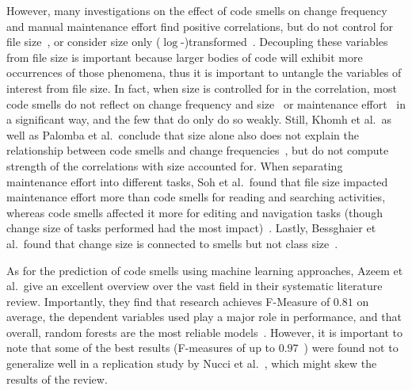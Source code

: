 However, many investigations on the effect of code smells on change frequency and manual maintenance effort find positive correlations,
but do not control for file size~\cite{Smell2009Olbrich,Smell2011Zazworka,Smells2009Khomh,Smells2014Ban,Smells2012Romano,Smells2017Ban,Smells2020Bessghaier},
or consider size only ($\log$-)transformed~\cite{Smells2014Yamashita}.
Decoupling these variables from file size is important because larger bodies of code will exhibit more occurrences of those phenomena,
thus it is important to untangle the variables of interest from file size.
In fact, when size is controlled for in the correlation,
most code smells do not reflect on change frequency and size~\cite{Smells2012Sjoberg} or maintenance effort~\cite{Smells2010Olbrich,Smells2013Yamashita}
in a significant way,
and the few that do only do so weakly.
Still, Khomh et al.\ as well as Palomba et al.\ conclude that size alone also does not explain the relationship between code smells and change frequencies~\cite{Smells2011Khomh,Smells2018Palomba},
but do not compute strength of the correlations with size accounted for.
When separating maintenance effort into different tasks,
Soh et al.\ found that file size impacted maintenance effort more than code smells for reading and searching activities,
whereas code smells affected it more for editing and navigation tasks 
(though change size of tasks performed had the most impact)~\cite{Smells2016Soh}.
Lastly, Bessghaier et al.\ found that change size is connected to smells but not class size~\cite{Smells2021Bessghaier}.

As for the prediction of code smells using machine learning approaches,
Azeem et al.\ give an excellent overview over the vast field in their systematic literature review.
Importantly,
they find that research achieves F-Measure of $0.81$ on average,
the dependent variables used play a major role in performance,
and that overall, random forests are the most reliable models~\cite{SmellPredOverview2019Azeem}.
However,
it is important to note that some of the best results (F-measures of up to $0.97$~\cite{SmellPred2016Fontana})
were found not to generalize well in a replication study by Nucci et al.~\cite{SmellPred2018Nucci},
which might skew the results of the review.